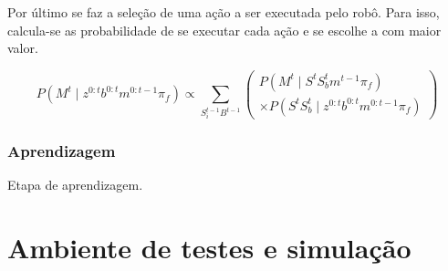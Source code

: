 Por último se faz a seleção de uma ação a ser executada pelo robô. Para isso, calcula-se as probabilidade de se executar cada ação e se escolhe a com maior valor.
		
\begin{equation}
    P \left( M^t \mid z^{0: t} b^{0: t} m^{0: t-1} \pi_f \right) \propto \sum\limits_{S_i^{t-1} B^{t-1}}
        \left(
            \begin{array}{l}
                P \left( M^t \mid S^t S_b^t m^{t-1} \pi_f \right)\\
                \times P \left( S^t S_b^t \mid z^{0: t} b^{0: t} m^{0: t-1} \pi_f \right)
            \end{array}
        \right)
\end{equation}


\subsubsection{Aprendizagem}

Etapa de aprendizagem.


\section{Ambiente de testes e simulação}

